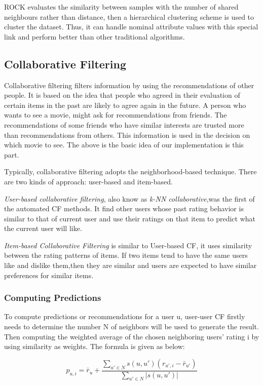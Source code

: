 \documentclass[conference]{IEEEtran}
\begin{document}
ROCK evaluates the similarity between samples with the number of shared neighbours rather than distance, then a hierarchical clustering scheme is used to cluster the dataset. Thus, it can handle nominal attribute values with this special link and perform better than other traditional algorithms.

\subsection{Collaborative Filtering}

Collaborative filtering filters information by using the recommendations of other people. It is based on the idea that people who agreed in their evaluation of certain items in the past are likely to agree again in the future. A person who wants to see a movie, might ask for recommendations from friends. The recommendations of some friends who have similar interests are trusted more than recommendations from others. This information is used in the decision on which movie to see. The above is the basic idea of our implementation is this part.

Typically, collaborative filtering adopts the neighborhood-based technique. There are two kinds of approach: user-based and item-based.

\textit{User-based collaborative filtering}, also know as \textit{k-NN collaborative},was the first of the automated CF methods. It find other users whose past rating behavior is similar to that of current user and
use their ratings on that item to predict what the current user will like. 

\textit{Item-based Collaborative Filtering} is similar to User-based CF, it uses similarity between the rating patterns of items. If two items tend to have the same users like and dislike them,then they are similar and users are expected to have similar preferences for similar items.
\subsubsection{Computing Predictions}
To compute predictions or recommendations for a user u, user-user CF firstly needs to determine the number N of neighbors will be used to generate the result. Then computing the weighted average of the chosen neighboring users' rating i by using similarity as weights. The formula is given as below:

\begin{equation}
p_{u,i} ={\bar r_{u}}  + \frac
{\sum\nolimits_{u' \in N} s(u,u')(r_{u',i} - {\bar r_{u'}})} 
{\sum\nolimits_{u' \in N} |s(u,u')|}
\end{equation}
\end{document}
